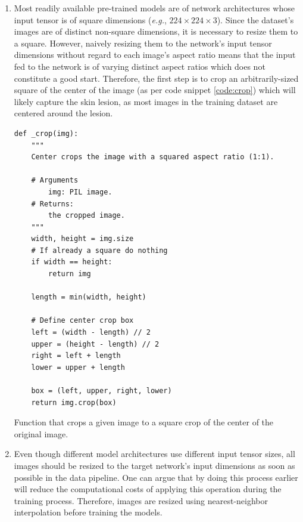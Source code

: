     \begin{enumerate}
        \item Most readily available pre-trained models are of network architectures whose input tensor is of square dimensions (\textit{e.g.}, $224 \times 224 \times 3$). Since the dataset's images are of distinct non-square dimensions, it is necessary to resize them to a square. However, naively resizing them to the network's input tensor dimensions without regard to each image's aspect ratio means that the input fed to the network is of varying distinct aspect ratios which does not constitute a good start. Therefore, the first step is to crop an arbitrarily-sized square of the center of the image (as per code snippet \ref{code:crop}) which will likely capture the skin lesion, as most images in the training dataset are centered around the lesion. \par
    
\begin{listing}[ht]
\begin{verbatim}
def _crop(img):
    """
    Center crops the image with a squared aspect ratio (1:1).
    
    # Arguments
        img: PIL image.
    # Returns:
        the cropped image.
    """
    width, height = img.size
    # If already a square do nothing
    if width == height:
        return img

    length = min(width, height)

    # Define center crop box
    left = (width - length) // 2
    upper = (height - length) // 2
    right = left + length
    lower = upper + length

    box = (left, upper, right, lower)
    return img.crop(box)
\end{verbatim}
\caption{Function that crops a given image to a square crop of the center of the original image.}
\label{code:crop}
\end{listing}
    
    \item Even though different model architectures use different input tensor sizes, all images should be resized to the target network's input dimensions as soon as possible in the data pipeline. One can argue that by doing this process earlier will reduce the computational costs of applying this operation during the training process. Therefore, images are resized using nearest-neighbor interpolation before training the models.
    


\end{enumerate}
